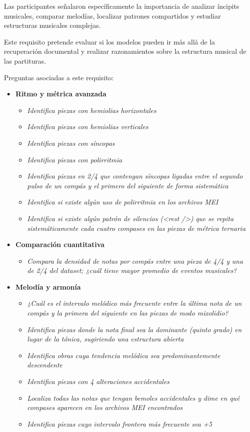 Las participantes señalaron específicamente la importancia de analizar íncipits musicales, comparar melodías, localizar patrones compartidos y estudiar estructuras musicales complejas.

Este requisito pretende evaluar si los modelos pueden ir más allá de la recuperación documental y realizar razonamientos sobre la estructura musical de las partituras.

Preguntas asociadas a este requisito:
\begin{itemize}
    \item \textbf{Ritmo y métrica avanzada}
    \begin{itemize}
    \item \textit{Identifica piezas con hemiolias horizontales}
    \item \textit{Identifica piezas con hemiolias verticales}
    \item \textit{Identifica piezas con síncopas}
    \item \textit{Identifica piezas con polirritmia}
    \item \textit{Identifica piezas en 2/4 que contengan síncopas ligadas entre el segundo pulso de un compás y el primero del siguiente de forma sistemática}
    \item \textit{Identifica si existe algún uso de polirritmia en los archivos MEI}
    \item \textit{Identifica si existe algún patrón de silencios (<rest />) que se repita sistemáticamente cada cuatro compases en las piezas de métrica ternaria}
    \end{itemize}
    \item \textbf{Comparación cuantitativa}
    \begin{itemize}
    \item \textit{Compara la densidad de notas por compás entre una pieza de 4/4 y una de 2/4 del dataset; ¿cuál tiene mayor promedio de eventos musicales?}
    \end{itemize}
    \item \textbf{Melodía y armonía}
    \begin{itemize}
    \item \textit{¿Cuál es el intervalo melódico más frecuente entre la última nota de un compás y la primera del siguiente en las piezas de modo mixolidio?}
    \item \textit{Identifica piezas donde la nota final sea la dominante (quinto grado) en lugar de la tónica, sugiriendo una estructura abierta}
    \item \textit{Identifica obras cuya tendencia melódica sea predominantemente descendente}
    \item \textit{Identifica piezas con 4 alteraciones accidentales}
    \item \textit{Localiza todas las notas que tengan bemoles accidentales y dime en qué compases aparecen en los archivos MEI encontrados}
    \item \textit{Identifica piezas cuyo intervalo frontera más frecuente sea +5}
    \end{itemize}
\end{itemize}

